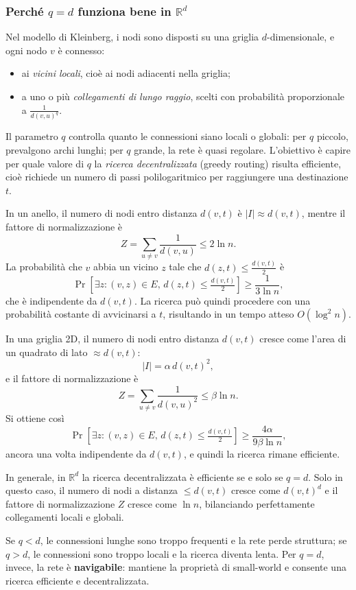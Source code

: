 \newpage
\subsubsection{Perché $q = d$ funziona bene in $\mathbb{R}^d$}

Nel modello di Kleinberg, i nodi sono disposti su una griglia $d$-dimensionale, e ogni nodo $v$ è connesso:
\begin{itemize}
    \item ai \textit{vicini locali}, cioè ai nodi adiacenti nella griglia;
    \item a uno o più \textit{collegamenti di lungo raggio}, scelti con probabilità proporzionale a $\frac{1}{d(v,u)^q}$.
\end{itemize}

Il parametro $q$ controlla quanto le connessioni siano locali o globali: per $q$ piccolo, prevalgono archi lunghi; per $q$ grande, la rete è quasi regolare. L'obiettivo è capire per quale valore di $q$ la \textit{ricerca decentralizzata} (greedy routing) risulta efficiente, cioè richiede un numero di passi polilogaritmico per raggiungere una destinazione $t$.

In un anello, il numero di nodi entro distanza $d(v,t)$ è $|I| \approx d(v,t)$, mentre il fattore di normalizzazione è
\[
Z = \sum_{u \neq v} \frac{1}{d(v,u)} \le 2 \ln n.
\]
La probabilità che $v$ abbia un vicino $z$ tale che $d(z,t) \le \frac{d(v,t)}{2}$ è
\[
\Pr[\exists z: (v,z)\in E,\, d(z,t)\le\tfrac{d(v,t)}{2}] \ge \frac{1}{3\ln n},
\]
che è indipendente da $d(v,t)$. La ricerca può quindi procedere con una probabilità costante di avvicinarsi a $t$, risultando in un tempo atteso $O(\log^2 n)$.

In una griglia 2D, il numero di nodi entro distanza $d(v,t)$ cresce come l'area di un quadrato di lato $\approx d(v, t)$:
\[
|I| = \alpha\, d(v,t)^2,
\]
e il fattore di normalizzazione è
\[
Z = \sum_{u \neq v} \frac{1}{d(v,u)^2} \le \beta \ln n.
\]
Si ottiene così
\[
\Pr[\exists z: (v,z)\in E,\, d(z,t)\le\tfrac{d(v,t)}{2}] 
\ge \frac{4\alpha}{9\beta\ln n},
\]
ancora una volta indipendente da $d(v,t)$, e quindi la ricerca rimane efficiente.

In generale, in $\mathbb{R}^d$ la ricerca decentralizzata è efficiente se e solo se $q = d$.  
Solo in questo caso, il numero di nodi a distanza $\le d(v,t)$ cresce come $d(v,t)^d$ e il fattore di normalizzazione $Z$ cresce come $\ln n$, bilanciando perfettamente collegamenti locali e globali.  

Se $q < d$, le connessioni lunghe sono troppo frequenti e la rete perde struttura;  
se $q > d$, le connessioni sono troppo locali e la ricerca diventa lenta.  
Per $q = d$, invece, la rete è \textbf{navigabile}: mantiene la proprietà di small-world e consente una ricerca efficiente e decentralizzata.

